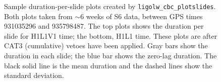\begin{figure}[p]
\begin{center}
\end{center}
\label{fig:sample_plotslide-duration}
\caption{Sample duration-per-slide plots created by \texttt{ligolw\_cbc\_plotslides}. Both plots taken from $\sim6$ weeks of \ac{S6} data, between GPS times 931035296 and 935798487. The top plots shows the duration per slide for H1L1V1 time; the bottom, H1L1 time. These plots are after CAT3 (cumulative) vetoes have been applied. Gray bars show the duration in each slide; the blue bar shows the zero-lag duration. The black solid line is the mean duration and the dashed lines show the standard deviation.}
\end{figure}

